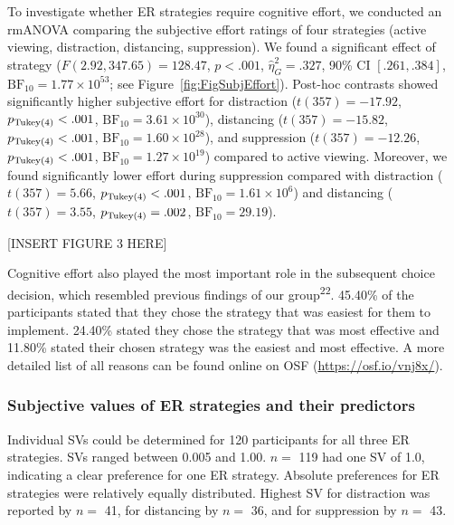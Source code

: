 \documentclass[
  man,floatsintext]{apa6}
\begin{document}
To investigate whether ER strategies require cognitive effort, we conducted an rmANOVA comparing the subjective effort ratings of four strategies (active viewing, distraction, distancing, suppression).
We found a significant effect of strategy (\(F(2.92, 347.65) = 128.47\), \(p < .001\), \(\hat{\eta}^2_G = .327\), 90\% CI \([.261, .384]\), \(\mathrm{BF}_{\textrm{10}} = 1.77 \times 10^{53}\); see Figure~\ref{fig:FigSubjEffort}).
Post-hoc contrasts showed significantly higher subjective effort for distraction (\(t(357) = -17.92\), \(p_\mathrm{\scriptsize Tukey(4)} < .001\), \(\mathrm{BF}_{\textrm{10}} = 3.61 \times 10^{30}\)), distancing (\(t(357) = -15.82\), \(p_\mathrm{\scriptsize Tukey(4)} < .001\), \(\mathrm{BF}_{\textrm{10}} = 1.60 \times 10^{28}\)), and suppression (\(t(357) = -12.26\), \(p_\mathrm{\scriptsize Tukey(4)} < .001\), \(\mathrm{BF}_{\textrm{10}} = 1.27 \times 10^{19}\)) compared to active viewing.
Moreover, we found significantly lower effort during suppression compared with distraction (\(t(357) = 5.66\), \(p_\mathrm{\scriptsize Tukey(4)} < .001\), \(\mathrm{BF}_{\textrm{10}} = 1.61 \times 10^{6}\)) and distancing (\(t(357) = 3.55\), \(p_\mathrm{\scriptsize Tukey(4)} = .002\), \(\mathrm{BF}_{\textrm{10}} = 29.19\)).

{[}INSERT FIGURE 3 HERE{]}

Cognitive effort also played the most important role in the subsequent choice decision, which resembled previous findings of our group\textsuperscript{22}.
45.40\% of the participants stated that they chose the strategy that was easiest for them to implement.
24.40\% stated they chose the strategy that was most effective and 11.80\% stated their chosen strategy was the easiest and most effective.
A more detailed list of all reasons can be found online on OSF (\url{https://osf.io/vnj8x/}).

\hypertarget{subjective-values-of-er-strategies-and-their-predictors}{%
\subsubsection{Subjective values of ER strategies and their predictors}\label{subjective-values-of-er-strategies-and-their-predictors}}

Individual SVs could be determined for 120 participants for all three ER strategies.
SVs ranged between 0.005 and 1.00.
\(n=\) 119 had one SV of 1.0, indicating a clear preference for one ER strategy.
Absolute preferences for ER strategies were relatively equally distributed.
Highest SV for distraction was reported by \(n=\) 41, for distancing by \(n=\) 36, and for suppression by \(n=\) 43.
\end{document}
